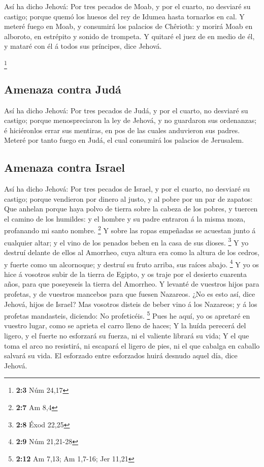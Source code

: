  Así ha dicho Jehová: Por tres pecados de Moab, y por el
cuarto, no desviaré su castigo; porque quemó los huesos del rey de
Idumea hasta tornarlos en cal.  Y meteré fuego en Moab, y
consumirá los palacios de Chêrioth: y morirá Moab en alboroto, en
estrépito y sonido de trompeta.  Y quitaré el juez de en
medio de él, y mataré con él á todos sus príncipes, dice Jehová.

\footnote{\textbf{2:3} Núm 24,17}

\hypertarget{amenaza-contra-juduxe1}{%
\subsection{Amenaza contra Judá}\label{amenaza-contra-juduxe1}}

 Así ha dicho Jehová: Por tres pecados de Judá, y por el
cuarto, no desviaré su castigo; porque menospreciaron la ley de Jehová,
y no guardaron sus ordenanzas; é hiciéronlos errar sus mentiras, en pos
de las cuales anduvieron sus padres.  Meteré por tanto fuego
en Judá, el cual consumirá los palacios de Jerusalem.

\hypertarget{amenaza-contra-israel}{%
\subsection{Amenaza contra Israel}\label{amenaza-contra-israel}}

 Así ha dicho Jehová: Por tres pecados de Israel, y por el
cuarto, no desviaré su castigo; porque vendieron por dinero al justo, y
al pobre por un par de zapatos:  Que anhelan porque haya
polvo de tierra sobre la cabeza de los pobres, y tuercen el camino de
los humildes: y el hombre y su padre entraron á la misma moza,
profanando mi santo nombre. \footnote{\textbf{2:7} Am 8,4} 
Y sobre las ropas empeñadas se acuestan junto á cualquier altar; y el
vino de los penados beben en la casa de sus dioses. \footnote{\textbf{2:8}
  Éxod 22,25}  Y yo destruí delante de ellos al Amorrheo,
cuya altura era como la altura de los cedros, y fuerte como un
alcornoque; y destruí su fruto arriba, sus raíces abajo. \footnote{\textbf{2:9}
  Núm 21,21-28}  Y yo os hice á vosotros subir de la tierra
de Egipto, y os traje por el desierto cuarenta años, para que poseyeseis
la tierra del Amorrheo.  Y levanté de vuestros hijos para
profetas, y de vuestros mancebos para que fuesen Nazareos. ¿No es esto
así, dice Jehová, hijos de Israel?  Mas vosotros disteis de
beber vino á los Nazareos; y á los profetas mandasteis, diciendo: No
profeticéis. \footnote{\textbf{2:12} Am 7,13; Am 1,7-16; Jer 11,21}
 Pues he aquí, yo os apretaré en vuestro lugar, como se
aprieta el carro lleno de haces;  Y la huída perecerá del
ligero, y el fuerte no esforzará su fuerza, ni el valiente librará su
vida;  Y el que toma el arco no resistirá, ni escapará el
ligero de pies, ni el que cabalga en caballo salvará su vida.
 El esforzado entre esforzados huirá desnudo aquel día,
dice Jehová.


